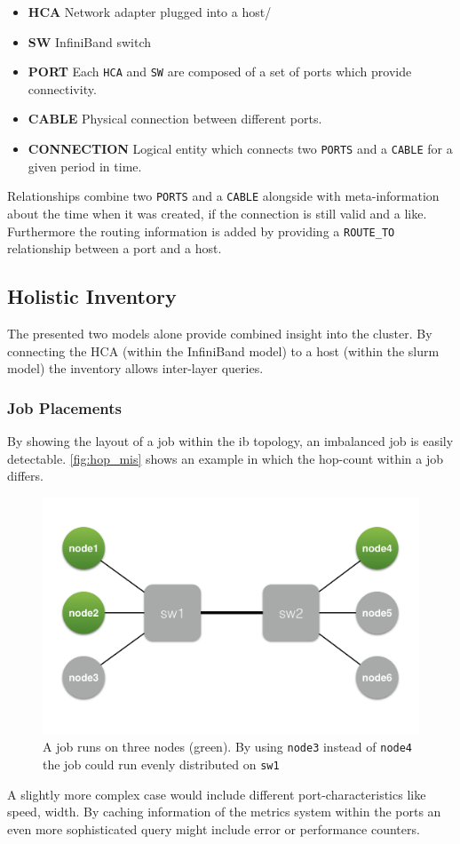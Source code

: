 \begin{itemize}
    \item \textbf{HCA} Network adapter plugged into a host/
    \item \textbf{SW} InfiniBand switch
    \item \textbf{PORT} Each \lstinline{HCA} and \lstinline{SW} are composed of a set of ports which provide connectivity.
    \item \textbf{CABLE} Physical connection between different ports.
    \item \textbf{CONNECTION} Logical entity which connects two \lstinline{PORTS} and a \lstinline{CABLE} for a given period in time.
\end{itemize}

Relationships combine two \lstinline{PORTS} and a \lstinline{CABLE} alongside with meta-information about the time when it was created, if the connection is still valid and a like.
Furthermore the routing information is added by providing a \lstinline{ROUTE_TO} relationship between a port and a host.

\subsection{Holistic Inventory}
The presented two models alone provide combined insight into the cluster. By connecting the HCA (within the InfiniBand model) to a host (within the \gls{slurm} model) the inventory allows inter-layer queries.

\subsubsection{Job Placements}
By showing the layout of a job within the \gls{ib} topology, an imbalanced job is easily detectable. \autoref{fig:hop_mis} shows an example in which the hop-count within a job differs.
\begin{figure}[!ht]
    \includegraphics[width=.4\textwidth]{images/png/hop_missmatch.png}
    \caption{\label{fig:hop_mis}A job runs on three nodes (green). By using \lstinline{node3} instead of \lstinline{node4} the job could run evenly distributed on \lstinline{sw1}}
\end{figure}
A slightly more complex case would include different port-characteristics like speed, width.
By caching information of the metrics system within the ports an even more sophisticated query might include error or performance counters.

